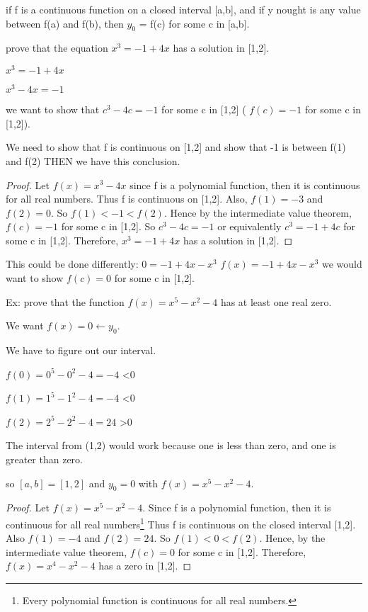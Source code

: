 \documentclass[12pt]{article}
\begin{document}
if f is a continuous function on a closed interval [a,b], and if y nought is any value between f(a) and f(b),
then $y_0$ = f(c) for some c in [a,b].


prove that the equation $x^3 = -1 + 4x$ has a solution in [1,2].

$x^3 = -1 + 4x$

$x^3 - 4x = -1$

we want to show that $c^3 - 4c = -1$ for some c in [1,2] ( $f(c) = -1$ for some c in [1,2]).

We need to show that f is continuous on [1,2] and show that -1 is between f(1) and f(2) THEN we have this conclusion.

\begin{proof}
Let $f(x) = x^3 - 4x$ since f is a polynomial function, then it is continuous for all real numbers. Thus f is
continuous on [1,2]. Also, $f(1) = -3$ and $f(2) = 0$. So $f(1) < -1 < f(2)$. Hence by the intermediate value
theorem, $f(c) = -1$ for some c in [1,2]. So $c^3-4c=-1$ or equivalently $c^3=-1+4c$ for some c in
[1,2]. Therefore, $x^3 = -1 + 4x$ has a solution in [1,2].
\end{proof}
This could be done differently:
$0 = -1 + 4x - x^3$
$f(x) = -1 + 4x - x^3$
we would want to show $f(c) = 0$ for some c in [1,2].


Ex: prove that the function $f(x) = x^5 - x^2 - 4$ has at least one real zero.

We want $f(x) = 0 \leftarrow y_0$. 

We have to figure out our interval.

$f(0) = 0^5 - 0^2 - 4 = -4$ <0

$f(1) = 1^5 - 1^2 - 4 = -4$ <0

$f(2) = 2^5 - 2^2 - 4 = 24$ >0

The interval from (1,2) would work because one is less than zero, and one is greater than zero.

so $[a,b] = [1,2]$ and $y_0 = 0$ with $f(x) = x^5 - x^2 - 4$.


\begin{proof}
Let $f(x) = x^5 - x^2 - 4$. Since f is a polynomial function, then it is continuous for all real
numbers\footnote{Every polynomial function is continuous for all real numbers.} Thus f is continuous on the
closed interval [1,2]. Also $f(1) = -4$ and $f(2) = 24$. So $f(1) < 0 < f(2)$. Hence, by the intermediate
value theorem, $f(c) = 0$ for some c in [1,2]. Therefore, $f(x) = x^4 - x^2-4$ has a zero in [1,2].
\end{proof}
\end{document}
